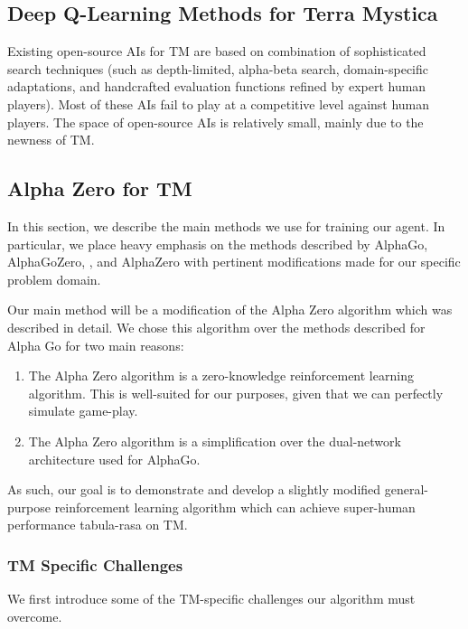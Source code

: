 \documentclass[10pt,twocolumn,letterpaper]{article}
\begin{document}
\subsection{Deep Q-Learning Methods for Terra Mystica}
\label{section:deep_qlearning_methods_for_tm}
Existing open-source AIs for TM are based on  combination of sophisticated search techniques (such as depth-limited, alpha-beta search, domain-specific adaptations, and handcrafted evaluation functions refined by expert human players). Most of these AIs fail to play at a competitive level against human players. The space of open-source AIs is relatively small, mainly due to the newness of TM.

\subsection{Alpha Zero for TM}
\label{subsection:alpha_zero_for_tm}
In this section, we describe the main methods we use for training our agent. In particular, we place heavy emphasis on the methods described by AlphaGo\cite{AlphaGo}, AlphaGoZero, \cite{AlphaGoZero}, and AlphaZero \cite{AlphaZero} with pertinent modifications made for our specific problem domain.

Our main method will be a modification of the Alpha Zero \cite{AlphaZero} algorithm which was described in detail. We chose this algorithm over the methods described for Alpha Go \cite{AlphaGo} for two main reasons:
\begin{enumerate}
    \item The Alpha Zero algorithm is a zero-knowledge reinforcement learning algorithm. This is well-suited for our purposes, given that we can perfectly simulate game-play. 
    \item The Alpha Zero algorithm is a simplification over the dual-network architecture used for AlphaGo.
\end{enumerate}

As such, our goal is to demonstrate and develop a slightly modified general-purpose reinforcement learning algorithm which can achieve super-human performance tabula-rasa on TM.

\subsubsection{TM Specific Challenges}
\label{subsubsection:tm_specific_challenges}
We first introduce some of the TM-specific challenges our algorithm must overcome.
\end{document}
